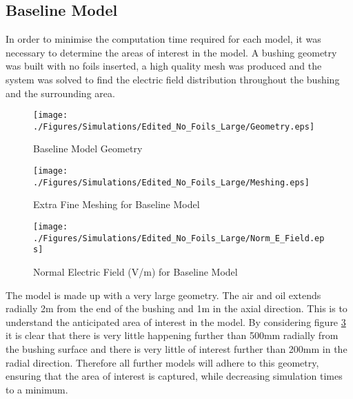 \subsection{Baseline Model}
In order to minimise the computation time required for each model, it was necessary to determine the areas of interest in the model.
A bushing geometry was built with no foils inserted, a high quality mesh was produced and the system was solved to find the electric field distribution throughout the bushing and the surrounding area.
\begin{figure}[!h]
  \centering
    \texttt{[image: ./Figures/Simulations/Edited\_No\_Foils\_Large/Geometry.eps]} 
\caption{Baseline Model Geometry}
\label{Figure:No_Foil_Large_Geom}
\end{figure}

\begin{figure}[!h]
  \centering
    \texttt{[image: ./Figures/Simulations/Edited\_No\_Foils\_Large/Meshing.eps]} 
\caption{Extra Fine Meshing for Baseline Model}
\label{Figure:No_Foil_Large_Mesh}
\end{figure}

\begin{figure}[!h]
  \centering
    \texttt{[image: ./Figures/Simulations/Edited\_No\_Foils\_Large/Norm\_E\_Field.eps]} 
\caption{Normal Electric Field (V/m) for Baseline Model}
\label{Figure:No_Foil_Large_Field}
\end{figure}

The model is made up with a very large geometry. 
The air and oil extends radially 2m from the end of the bushing and 1m in the axial direction.
This is to understand the anticipated area of interest in the model.
By considering figure \ref{Figure:No_Foil_Large_Field} it is clear that there is very little happening further than 500mm radially from the bushing surface and there is very little of interest further than 200mm in the radial direction.
Therefore all further models will adhere to this geometry, ensuring that the area of interest is captured, while decreasing simulation times to a minimum.

